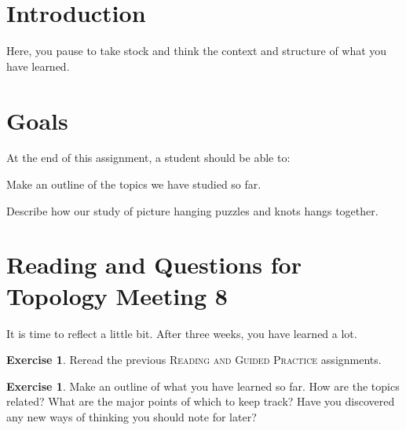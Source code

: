 \documentclass[12pt,letterpaper]{article}
\theoremstyle{definition}
\newtheorem{exercise}[question]{Exercise}
\begin{document}
\setlength{\parskip}{1ex plus 0.5ex minus 0.2ex}
\setlength{\parindent}{0pt}

\pagestyle{fancy}
\cfoot{}

\section*{Introduction}

Here, you pause to take stock and think the context and structure of what you have learned.

\section*{Goals}
At the end of this assignment, a student should be able to:
\begin{compactitem}
\item Make an outline of the topics we have studied so far.
\item Describe how our study of picture hanging puzzles and knots hangs together.
\end{compactitem}


\section*{Reading and Questions for Topology Meeting 8}


It is time to reflect a little bit. After three weeks, you have learned a lot.

\begin{exercise}
Reread the previous \textsc{Reading and Guided Practice} assignments.
\end{exercise}

\begin{exercise}
Make an outline of what you have learned so far.
How are the topics related?
What are the major points of which to keep track?
Have you discovered any new ways of thinking you should note for later?
\end{exercise}






\end{document}
